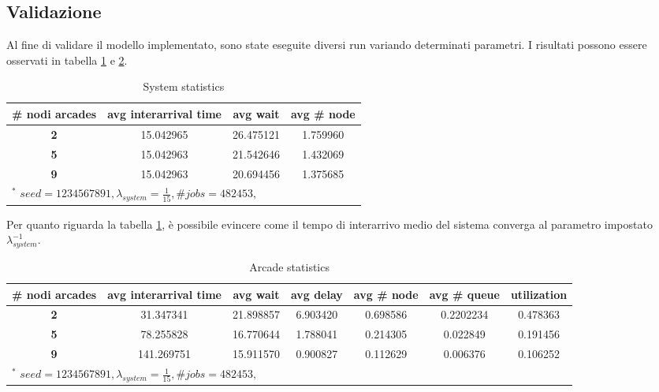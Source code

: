 \documentclass{article}
\begin{document}
\subsection{Validazione}
Al fine di validare il modello implementato, sono state eseguite diversi run variando determinati parametri. I risultati possono essere osservati in tabella \ref{tab1} e \ref{tab2}.

\begin{table}[htbp]
\caption{System statistics}
\begin{center}
\begin{tabular}{|c|c|c|c|}
\hline
\textbf{\# nodi arcades} & \textbf{avg interarrival time} & \textbf{avg wait} & \textbf{avg \# node} \\ \hline
\textbf{2} & 15.042965 & 26.475121 & 1.759960 \\ \hline
\textbf{5} & 15.042963 & 21.542646 & 1.432069 \\ \hline
\textbf{9} & 15.042963 & 20.694456 & 1.375685 \\ \hline
\multicolumn{4}{l}{$^{\mathrm{*}}$ $seed=1234567891, \lambda_{system} =\frac{1}{15} , \# jobs=482453, $}
\end{tabular}
\label{tab1}
\end{center}
\end{table}

Per quanto riguarda la tabella \ref{tab1}, è possibile evincere come il tempo di interarrivo medio del sistema converga al parametro impostato $\lambda_{system}^{-1}$.


\begin{table}[htbp]
\caption{Arcade statistics}
\begin{center}
\begin{tabular}{|c|c|c|c|c|c|c|}
\hline
\textbf{\# nodi arcades} & \textbf{avg interarrival time} & \textbf{avg wait} & \textbf{avg delay} & \textbf{avg \# node} & \textbf{avg \# queue} & \textbf{utilization} \\ \hline
\textbf{2} & 31.347341 & 21.898857 & 6.903420 & 0.698586 & 0.2202234 & 0.478363\\ \hline
\textbf{5} & 78.255828 & 16.770644 & 1.788041 & 0.214305 & 0.022849 & 0.191456\\ \hline
\textbf{9} & 141.269751 & 15.911570 & 0.900827 & 0.112629 & 0.006376 & 0.106252\\ \hline
\multicolumn{7}{l}{$^{\mathrm{*}}$ $seed=1234567891, \lambda_{system} =\frac{1}{15} , \# jobs=482453, $}
\end{tabular}
\label{tab2}
\end{center}
\end{table}
\end{document}
